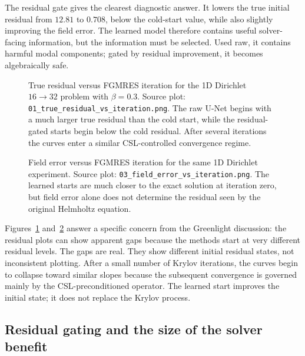 The residual gate gives the clearest diagnostic answer. It lowers the true
initial residual from $12.81$ to $0.708$, below the cold-start value, while
also slightly improving the field error. The learned model therefore contains
useful solver-facing information, but the information must be selected. Used
raw, it contains harmful modal components; gated by residual improvement, it
becomes algebraically safe.

\begin{figure}[htbp]
    \centering
    \caption{True residual versus FGMRES iteration for the 1D Dirichlet
    $16\to32$ problem with $\beta=0.3$. Source plot:
    \texttt{01\_true\_residual\_vs\_iteration.png}. The raw U-Net begins with
    a much larger true residual than the cold start, while the residual-gated
    starts begin below the cold residual. After several iterations the curves
    enter a similar CSL-controlled convergence regime.}
    \label{fig:results-1d-dirichlet-true-residual}
\end{figure}

\begin{figure}[htbp]
    \centering
    \caption{Field error versus FGMRES iteration for the same 1D Dirichlet
    experiment. Source plot:
    \texttt{03\_field\_error\_vs\_iteration.png}.
    The learned starts are much closer to the exact solution at iteration
    zero, but field error alone does not determine the residual seen by the
    original Helmholtz equation.}
    \label{fig:results-1d-dirichlet-field-error}
\end{figure}

Figures~\ref{fig:results-1d-dirichlet-true-residual}
and~\ref{fig:results-1d-dirichlet-field-error} answer a specific concern from
the Greenlight discussion: the residual plots can show apparent gaps because
the methods start at very different residual levels. The gaps are real. They
show different initial residual states, not inconsistent plotting. After a
small number of Krylov iterations, the curves begin to collapse toward similar
slopes because the subsequent convergence is governed mainly by the
CSL-preconditioned operator. The learned start improves the initial state; it
does not replace the Krylov process.

\subsection{Residual gating and the size of the solver benefit}
\label{subsec:results-gating-benefit}

